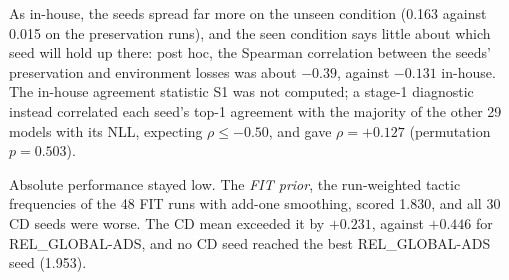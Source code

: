 As in-house, the seeds spread far more on the unseen condition (0.163
against 0.015 on the preservation runs), and the seen condition says
little about which seed will hold up there: post hoc, the Spearman
correlation between the seeds' preservation and environment losses was
about $-0.39$, against $-0.131$ in-house. The in-house agreement
statistic S1 was not computed; a stage-1 diagnostic instead correlated
each seed's top-1 agreement with the majority of the other 29 models
with its NLL, expecting $\rho \le -0.50$, and gave $\rho = +0.127$
(permutation $p = 0.503$).


Absolute performance stayed low. The \emph{FIT prior}, the
run-weighted tactic frequencies of the 48 FIT runs with add-one
smoothing, scored 1.830, and all 30 CD seeds were worse.
The CD mean exceeded it by $+0.231$, against $+0.446$ for
REL\_GLOBAL-ADS, and no CD seed reached the best REL\_GLOBAL-ADS seed
(1.953).

